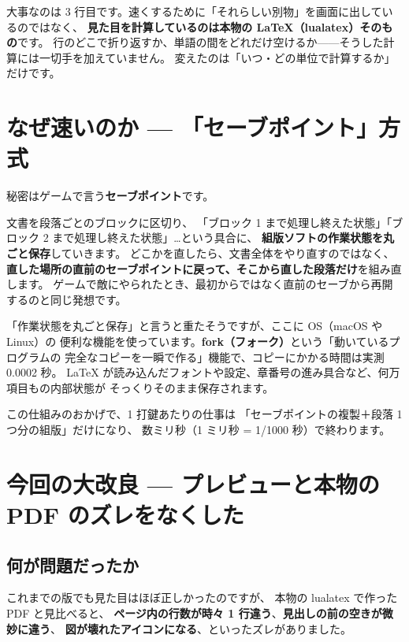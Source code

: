 \documentclass[11pt,a4paper]{ltjsarticle}
\begin{document}
大事なのは 3 行目です。速くするために「それらしい別物」を画面に出しているのではなく、
\textbf{見た目を計算しているのは本物の LaTeX（lualatex）そのもの}です。
行のどこで折り返すか、単語の間をどれだけ空けるか——そうした計算には一切手を加えていません。
変えたのは「いつ・どの単位で計算するか」だけです。

\section{なぜ速いのか --- 「セーブポイント」方式}

秘密はゲームで言う\textbf{セーブポイント}です。

文書を段落ごとのブロックに区切り、
「ブロック 1 まで処理し終えた状態」「ブロック 2 まで処理し終えた状態」…という具合に、
\textbf{組版ソフトの作業状態を丸ごと保存}していきます。
どこかを直したら、文書全体をやり直すのではなく、
\textbf{直した場所の直前のセーブポイントに戻って、そこから直した段落だけ}を組み直します。
ゲームで敵にやられたとき、最初からではなく直前のセーブから再開するのと同じ発想です。

「作業状態を丸ごと保存」と言うと重たそうですが、ここに OS（macOS や Linux）の
便利な機能を使っています。\textbf{fork（フォーク）}という「動いているプログラムの
完全なコピーを一瞬で作る」機能で、コピーにかかる時間は実測 0.0002 秒。
LaTeX が読み込んだフォントや設定、章番号の進み具合など、何万項目もの内部状態が
そっくりそのまま保存されます。

この仕組みのおかげで、1 打鍵あたりの仕事は
「セーブポイントの複製＋段落 1 つ分の組版」だけになり、
数ミリ秒（1 ミリ秒 = 1/1000 秒）で終わります。

\section{今回の大改良 --- プレビューと本物の PDF のズレをなくした}

\subsection{何が問題だったか}

これまでの版でも見た目はほぼ正しかったのですが、
本物の lualatex で作った PDF と見比べると、
\textbf{ページ内の行数が時々 1 行違う}、\textbf{見出しの前の空きが微妙に違う}、
\textbf{図が壊れたアイコンになる}、といったズレがありました。
\end{document}
